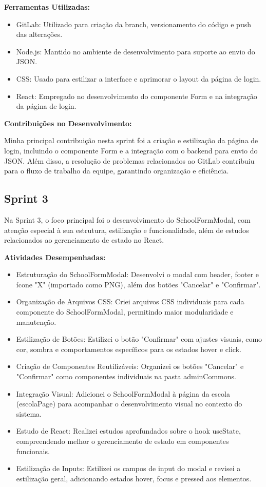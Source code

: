 \textbf{Ferramentas Utilizadas:}

\begin{itemize}
\item
  GitLab: Utilizado para criação da branch, versionamento do código e
  push das alterações.
\item
  Node.js: Mantido no ambiente de desenvolvimento para suporte ao envio
  do JSON.
\item
  CSS: Usado para estilizar a interface e aprimorar o layout da página
  de login.
\item
  React: Empregado no desenvolvimento do componente Form e na integração
  da página de login.
\end{itemize}

\textbf{Contribuições no Desenvolvimento:}

Minha principal contribuição nesta sprint foi a criação e estilização da
página de login, incluindo o componente Form e a integração com o
backend para envio do JSON. Além disso, a resolução de problemas
relacionados ao GitLab contribuiu para o fluxo de trabalho da equipe,
garantindo organização e eficiência.

\subsection{Sprint 3}

Na Sprint 3, o foco principal foi o desenvolvimento do SchoolFormModal,
com atenção especial à sua estrutura, estilização e funcionalidade, além
de estudos relacionados ao gerenciamento de estado no React.

\textbf{Atividades Desempenhadas:}

\begin{itemize}
\item
  Estruturação do SchoolFormModal: Desenvolvi o modal com header, footer
  e ícone "X" (importado como PNG), além dos botões "Cancelar" e
  "Confirmar".
\item
  Organização de Arquivos CSS: Criei arquivos CSS individuais para cada
  componente do SchoolFormModal, permitindo maior modularidade e
  manutenção.
\item
  Estilização de Botões: Estilizei o botão "Confirmar" com ajustes
  visuais, como cor, sombra e comportamentos específicos para os estados
  hover e click.
\item
  Criação de Componentes Reutilizáveis: Organizei os botões "Cancelar" e
  "Confirmar" como componentes individuais na pasta adminCommons.
\item
  Integração Visual: Adicionei o SchoolFormModal à página da escola
  (escolaPage) para acompanhar o desenvolvimento visual no contexto do
  sistema.
\item
  Estudo de React: Realizei estudos aprofundados sobre o hook useState,
  compreendendo melhor o gerenciamento de estado em componentes
  funcionais.
\item
  Estilização de Inputs: Estilizei os campos de input do modal e revisei
  a estilização geral, adicionando estados hover, focus e pressed aos
  elementos.
\end{itemize}

